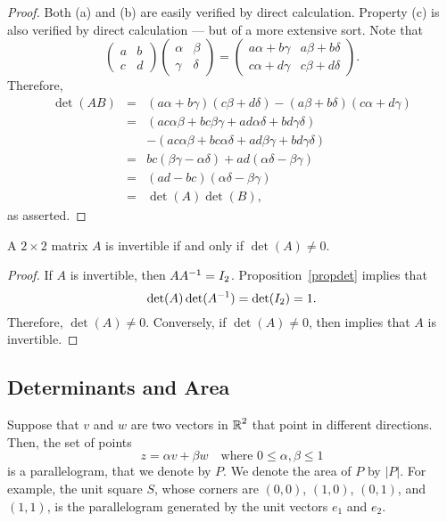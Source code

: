 \documentclass{ximera}
\begin{document}
\begin{proof} Both (a) and (b) are easily verified by direct
calculation.  Property (c) is also verified by direct
calculation --- but of a more extensive sort.  Note that
\[
\left(\begin{array}{cc} a & b\\ c & d \end{array}\right)
\left(\begin{array}{cc} \alpha & \beta \\ \gamma & \delta
\end{array}\right) =
\left(\begin{array}{cc} a\alpha+b\gamma & a\beta+b\delta \\
c\alpha+d\gamma & c\beta+d\delta\end{array}\right).
\]
Therefore,
\begin{eqnarray*}
\det(AB) & = & (a\alpha+b\gamma)(c\beta+d\delta) -
     (a\beta+b\delta)(c\alpha+d\gamma)\\
& = & (ac\alpha\beta+bc\beta\gamma+ad\alpha\delta+bd\gamma\delta) \\
& & -(ac\alpha\beta+bc\alpha\delta+ad\beta\gamma+bd\gamma\delta)\\
& = & bc(\beta\gamma-\alpha\delta) +
ad(\alpha\delta-\beta\gamma) \\
& = & (ad-bc)(\alpha\delta-\beta\gamma) \\
& = & \det(A)\det(B),
\end{eqnarray*}
as asserted.   \end{proof}

\begin{corollary}  \label{C:2x2invert} 
A $2\times 2$ matrix $A$ is invertible if and only if $\det(A)\neq 0$.
\end{corollary}

\begin{proof}  If $A$ is invertible, then $AA^{-1} = I_2$.
Proposition~\ref{propdet} implies that
\[
\det(A)\det(A^{-1}) = \det(I_2) = 1.
\]
Therefore, $\det(A)\neq 0$.  Conversely, if $\det(A)\neq 0$, then
 implies that $A$ is invertible.  \end{proof}


\subsection*{Determinants and Area}

Suppose that $v$ and $w$ are two vectors in $\mbox{$\Bbb{R}$}^2$ that point in different
directions.  Then, the set of points
\[
z=\alpha v + \beta w \quad\mbox{where } 0\leq\alpha,\beta\leq 1
\]
is a parallelogram, that we denote by $P$.
We denote the area of $P$ by $|P|$.  For example, the unit square $S$, whose
corners are $(0,0)$, $(1,0)$, $(0,1)$, and $(1,1)$, is the parallelogram
generated by the unit vectors $e_1$ and $e_2$.
\end{document}
